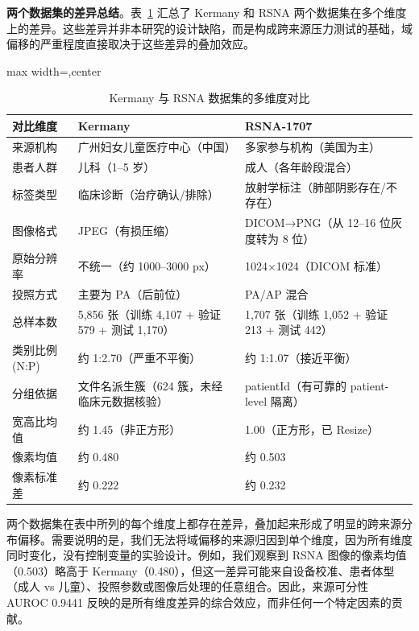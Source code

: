 \documentclass[12pt,a4paper,UTF8,openany]{ctexbook}
\begin{document}
\textbf{两个数据集的差异总结}。表~\ref{tab:dataset_comparison} 汇总了 Kermany 和 RSNA 两个数据集在多个维度上的差异。这些差异并非本研究的设计缺陷，而是构成跨来源压力测试的基础，域偏移的严重程度直接取决于这些差异的叠加效应。

\begin{table}[htbp]
\centering
\caption{Kermany 与 RSNA 数据集的多维度对比}
\label{tab:dataset_comparison}
\renewcommand{\arraystretch}{1.3}
\begin{adjustbox}{max width=\textwidth,center}
\begin{tabular}{p{2.8cm}p{4.5cm}p{4.5cm}}
\toprule
\textbf{对比维度} & \textbf{Kermany} & \textbf{RSNA-1707} \\
\midrule
来源机构 & 广州妇女儿童医疗中心（中国） & 多家参与机构（美国为主） \\
患者人群 & 儿科（1--5 岁） & 成人（各年龄段混合） \\
标签类型 & 临床诊断（治疗确认/排除） & 放射学标注（肺部阴影存在/不存在） \\
图像格式 & JPEG（有损压缩） & DICOM→PNG（从 12--16 位灰度转为 8 位） \\
原始分辨率 & 不统一（约 1000--3000 px） & 1024×1024（DICOM 标准） \\
投照方式 & 主要为 PA（后前位） & PA/AP 混合 \\
总样本数 & 5,856 张（训练 4,107 + 验证 579 + 测试 1,170） & 1,707 张（训练 1,052 + 验证 213 + 测试 442） \\
类别比例 (N:P) & 约 1:2.70（严重不平衡） & 约 1:1.07（接近平衡） \\
分组依据 & 文件名派生簇（624 簇，未经临床元数据核验） & patientId（有可靠的 patient-level 隔离） \\
宽高比均值 & 约 1.45（非正方形） & 1.00（正方形，已 Resize） \\
像素均值 & 约 0.480 & 约 0.503 \\
像素标准差 & 约 0.222 & 约 0.232 \\
\bottomrule
\end{tabular}
\end{adjustbox}
\end{table}

两个数据集在表中所列的每个维度上都存在差异，叠加起来形成了明显的跨来源分布偏移。需要说明的是，我们无法将域偏移的来源归因到单个维度，因为所有维度同时变化，没有控制变量的实验设计。例如，我们观察到 RSNA 图像的像素均值（0.503）略高于 Kermany（0.480），但这一差异可能来自设备校准、患者体型（成人 vs 儿童）、投照参数或图像后处理的任意组合。因此，来源可分性 AUROC 0.9441 反映的是所有维度差异的综合效应，而非任何一个特定因素的贡献。
\end{document}
